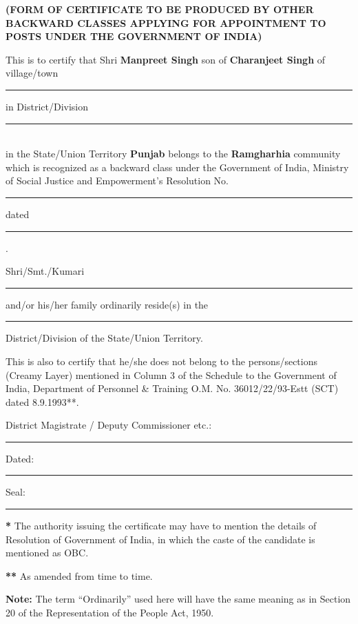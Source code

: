 \documentclass[12pt]{article}
\begin{document}
	
	\begin{center}
		\textbf{\large (FORM OF CERTIFICATE TO BE PRODUCED BY OTHER BACKWARD CLASSES APPLYING FOR APPOINTMENT TO POSTS UNDER THE GOVERNMENT OF INDIA)}
	\end{center}
	
	\vspace{1cm}
	
	\noindent
	This is to certify that Shri \textbf{Manpreet Singh} son of \textbf{Charanjeet Singh} 	of village/town \rule{5cm}{0.4pt} in District/Division \rule{5cm}{0.4pt} \\
	in the State/Union Territory \textbf{Punjab} belongs to the \textbf{Ramgharhia} community which is recognized as a backward class under the Government of India, Ministry of Social Justice and Empowerment’s Resolution No. \rule{5cm}{0.4pt} dated \rule{3cm}{0.4pt}.
	
	\vspace{0.5cm}
	
	\noindent
	Shri/Smt./Kumari \rule{6cm}{0.4pt} and/or his/her family ordinarily reside(s) in the \rule{5cm}{0.4pt} District/Division of the State/Union Territory.
	
	\vspace{0.5cm}
	
	\noindent
	This is also to certify that he/she does not belong to the persons/sections (Creamy Layer) mentioned in Column 3 of the Schedule to the Government of India, Department of Personnel \& Training O.M. No. 36012/22/93-Estt (SCT) dated 8.9.1993**.
	
	\vspace{1cm}
	
	\noindent
	District Magistrate / Deputy Commissioner etc.: \\
	\rule{8cm}{0.4pt}
	
	\vspace{0.5cm}
	
	\noindent
	Dated: \rule{5cm}{0.4pt}
	
	\vspace{0.5cm}
	
	\noindent
	Seal: \rule{5cm}{0.4pt}
	
	\vspace{1cm}
	
	\noindent
	\textbf{*} The authority issuing the certificate may have to mention the details of Resolution of Government of India, in which the caste of the candidate is mentioned as OBC.
	
	\vspace{0.3cm}
	
	\noindent
	\textbf{**} As amended from time to time.
	
	\vspace{0.3cm}
	
	\noindent
	\textbf{Note:} The term ``Ordinarily'' used here will have the same meaning as in Section 20 of the Representation of the People Act, 1950.
	
\end{document}

